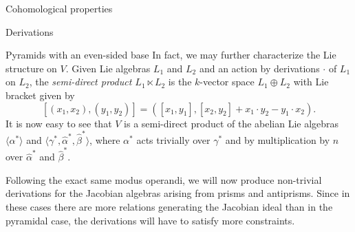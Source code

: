 \begin{chapter}{Cohomological properties}
\begin{section}{Derivations}
\begin{subsection}{Pyramids with an even-sided base}
In fact, we may further characterize the Lie structure on $V$. Given Lie algebras $L_1$ and $L_2$ and an action by derivations $\cdot$ of $L_1$ on $L_2$, the \emph{semi-direct product $L_1\ltimes L_2$} is the $k$-vector space $L_1 \oplus L_2$ with Lie bracket given by
\[[(x_1,x_2), (y_1,y_2)] = ([x_1,y_1], [x_2,y_2]+x_1\cdot y_2 - y_1\cdot x_2).\]
It is now easy to see that $V$ is a semi-direct product of the abelian Lie algebras $\langle \alpha^*\rangle$ and $\langle \gamma^*, \hat\alpha^*, \hat\beta^*\rangle$, where $\alpha^*$ acts trivially over $\gamma^*$ and by multiplication by $n$ over $\hat\alpha^*$ and $\hat\beta^*$.
\end{subsection}

Following the exact same modus operandi, we will now produce non-trivial derivations for the Jacobian algebras arising from prisms and antiprisms. Since in these cases there are more relations generating the Jacobian ideal than in the pyramidal case, the derivations will have to satisfy more constraints.


\end{section}
\end{chapter}
